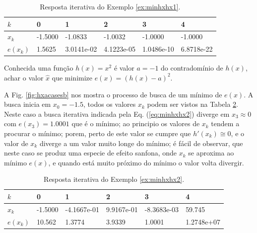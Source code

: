 \begin{table}[!h]
\centering
\begin{tabular}{|l|l|l|l|l|l|}
\hline
$k$      & 0 & 1 & 2 & 3 & 4 \\ \hline
$x_k$    & -1.5000 & -1.0833 & -1.0032 & -1.0000 & -1.0000 \\ \hline
$e(x_k)$ & 1.5625 & 3.0141e-02 & 4.1223e-05 & 1.0486e-10 & 6.8718e-22 \\ \hline
\end{tabular}
\caption{Resposta iterativa do Exemplo \ref{ex:minhxhx1}.}
\label{tab:hxacases1}
\end{table}

\begin{example}\label{ex:minhxhx2}
Conhecida uma função $h(x)=x^2$ é valor $a=-1$ do contradomínio de $h(x)$,
achar o valor $\hat{x}$ que minimize $e(x)=(h(x)-a)^2$.
\end{example}


\begin{SolutionT}\label{sol:minhxhx2}
A Fig. \ref{fig:hxacasesb} nos mostra o processo de busca de um mínimo de $e(x)$. 
A busca inicia em $x_0=-1.5$,
 todos os valores $x_{k}$ podem ser vistos na Tabela \ref{tab:hxacases2}. 
Neste caso a busca iterativa indicada pela Eq. (\ref{eq:minhxhx2}) diverge 
em $x_3\approx 0$ com $e(x_3)=1.0001$ que é o mínimo;
ao principio os valores de $x_{k}$ tendem a procurar o mínimo; porem,
perto de este valor se cumpre que $h'(x_{k})\cong 0$, e o valor de $x_{k}$ diverge
a um valor muito longe do mínimo; é fácil de observar, que neste caso se produz 
uma especie de efeito sanfona, onde $x_{k}$ se aproxima ao mínimo $e(x)$, e quando 
está muito próximo do mínimo o valor volta divergir.
\end{SolutionT}

\begin{table}[!h]
\centering
\begin{tabular}{|l|l|l|l|l|l|}
\hline
$k$      & 0 & 1 & 2 & 3 & 4 \\ \hline
$x_k$    & -1.5000 & -4.1667e-01 & 9.9167e-01 & -8.3683e-03 & 59.745 \\ \hline
$e(x_k)$ & 10.562 & 1.3774 & 3.9339 & 1.0001 & 1.2748e+07 \\ \hline
\end{tabular}
\caption{Resposta iterativa do Exemplo \ref{ex:minhxhx2}.}
\label{tab:hxacases2}
\end{table}

